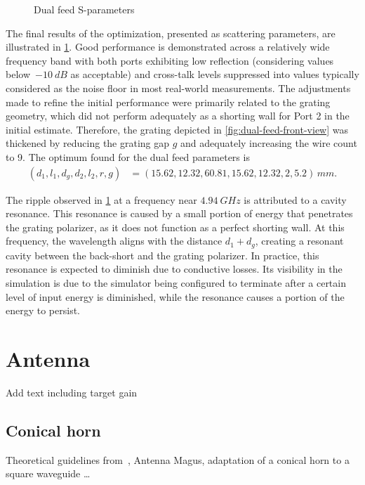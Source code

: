 \documentclass[11pt,a4paper,twoside,openany]{report}
\begin{document}
\begin{figure}[!ht]
    \centering
    
    \caption{\label{fig:dual-feed-sparameters}Dual feed S-parameters}
\end{figure}

The final results of the optimization, presented as scattering parameters, are illustrated in \cref{fig:dual-feed-sparameters}. Good performance is demonstrated across a relatively wide frequency band with both ports exhibiting low reflection (considering values below~$-\qty{10}{dB}$ as acceptable) and cross-talk levels suppressed into values typically considered as the noise floor in most real-world measurements. The adjustments made to refine the initial performance were primarily related to the grating geometry, which did not perform adequately as a shorting wall for Port 2 in the initial estimate. Therefore, the grating depicted in \cref{fig:dual-feed-front-view} was thickened by reducing the grating gap $g$ and adequately increasing the wire count to 9. The optimum found for the dual feed parameters is
\begin{align}
    (d_1,l_1,d_g,d_2,l_2,r,g) &= (15.62,12.32,60.81,15.62, 12.32,2,5.2)\,\unit{mm}.
\end{align}

\begin{remark}
    The ripple observed in \cref{fig:dual-feed-sparameters} at a frequency near $\qty{4.94}{GHz}$ is attributed to a cavity resonance. This resonance is caused by a small portion of energy that penetrates the grating polarizer, as it does not function as a perfect shorting wall. At this frequency, the wavelength aligns with the distance $d_1+d_g$, creating a resonant cavity between the back-short and the grating polarizer. In practice, this resonance is expected to diminish due to conductive losses. Its visibility in the simulation is due to the simulator being configured to terminate after a certain level of input energy is diminished, while the resonance causes a portion of the energy to persist.
\end{remark}


\chapter{Antenna}
\label{chapter:antenna}
Add text including target gain

\section{Conical horn}
Theoretical guidelines from~\parencite{aboserwal-et-al:conical-horn-gain-and-amplitude-patterns}, Antenna Magus, adaptation of a conical horn to a square waveguide \dots
\end{document}
